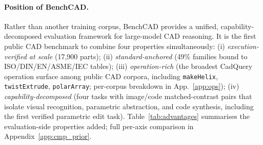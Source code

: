 \paragraph{Position of BenchCAD.}
Rather than another training corpus, BenchCAD provides a unified, capability-decomposed evaluation framework for large-model CAD reasoning. It is the first public CAD benchmark to combine four properties simultaneously: (i) \emph{execution-verified at scale} (17{,}900 parts); (ii) \emph{standard-anchored} (49\% families bound to ISO/DIN/EN/ASME/IEC tables); (iii) \emph{operation-rich} (the broadest CadQuery operation surface among public CAD corpora, including \texttt{makeHelix}, \texttt{twistExtrude}, \texttt{polarArray}; per-corpus breakdown in App.~\ref{app:ops}); (iv) \emph{capability-decomposed} (four tasks with image/code matched-contrast pairs that isolate visual recognition, parametric abstraction, and code synthesis, including the first verified parametric edit task). Table~\ref{tab:advantages} summarises the evaluation-side properties added; full per-axis comparison in Appendix~\ref{app:cmp_prior}.

